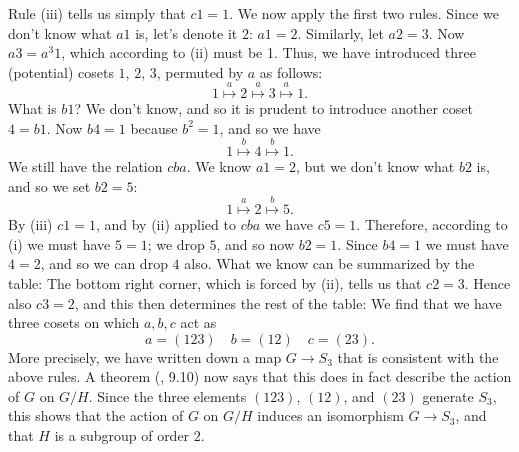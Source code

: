 \documentclass[a4paper,11pt,final,openany]{memoir}%
\theoremstyle{nonumberplain}
\begin{document}
Rule (iii) tells us simply that $c1=1$. We now apply the first two rules.
Since we don't know what $a1$ is, let's denote it $2$: $a1=2$. Similarly, let
$a2=3$. Now $a3=a^{3}1$, which according to (ii) must be 1. Thus, we have
introduced three (potential) cosets $1$, $2$, $3$, permuted by $a$ as
follows:
\[
1\overset{a}{\mapsto}2\overset{a}{\mapsto}3\overset{a}{\mapsto}1.
\]
What is $b1$? We don't know, and so it is prudent to introduce another coset
$4=b1$. Now $b4=1$ because $b^{2}=1$, and so we have
\[
1\overset{b}{\mapsto}4\overset{b}{\mapsto}1.
\]
We still have the relation $cba$. We know $a1=2$, but we don't know what $b2$
is, and so we set $b2=5$:%
\[
1\overset{a}{\mapsto}2\overset{b}{\mapsto}5.
\]
By (iii) $c1=1$, and by (ii) applied to $cba$ we have $c5=1$. Therefore,
according to (i) we must have $5=1$; we drop $5$, and so now $b2=1$. Since
$b4=1$ we must have $4=2$, and so we can drop $4$ also. What we know can be
summarized by the table:
The bottom right corner, which is forced by (ii), tells us that $c2=3$. Hence
also $c3=2$, and this then determines the rest of the table:
We find that we have three cosets on which $a,b,c$ act as
\[
a=(123)\quad b=(12)\quad c=(23).
\]
More precisely, we have written down a map $G\rightarrow S_{3}$ that is
consistent with the above rules. A theorem (\cite{artin1991}, 9.10) now says
that this does in fact describe the action of $G$ on $G/H$. Since the three
elements $(123)$, $(12)$, and $(23)$ generate $S_{3}$, this shows that the
action of $G$ on $G/H$ induces an isomorphism $G\rightarrow S_{3}$, and that
$H$ is a subgroup of order $2$.
\end{document}
